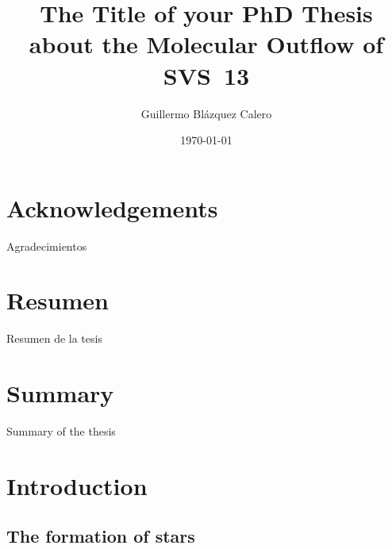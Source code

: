 \documentclass[12pt]{mythesis}
\title{The Title of your PhD Thesis about the Molecular Outflow of SVS~13}
\author{Guillermo Blázquez Calero}
\date{\today}
\begin{document}
\frontmatter %
\maketitle
\cleardoublepage

\chapter*{Acknowledgements}

Agradecimientos

\chapter*{Resumen}

Resumen de la tesis

\chapter*{Summary}

Summary of the thesis

\tableofcontents


\mainmatter %
\chapter{Introduction}



\section{The formation of stars}
\end{document}
